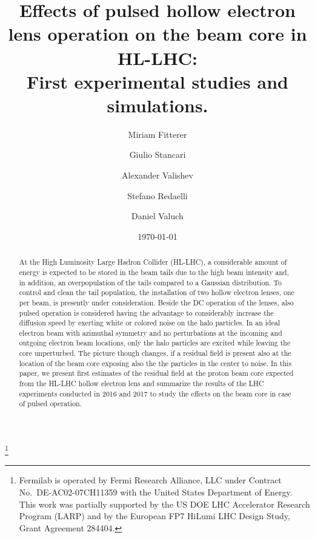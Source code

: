 \documentclass[%
 reprint,
 amsmath,amssymb,
 aps,
prstab,
]{revtex4-1}
\begin{document}
\title{Effects of pulsed hollow electron lens operation on the beam core in HL-LHC: \\First experimental studies and simulations.}%
\thanks{Fermilab is operated by Fermi Research Alliance, LLC under
	Contract No.~DE-AC02-07CH11359 with the United States Department of
	Energy. This work was partially supported by the US DOE LHC
	Accelerator Research Program (LARP) and by the European FP7 HiLumi
	LHC Design Study, Grant Agreement 284404.}

\author{Miriam Fitterer}
\author{Giulio Stancari}%
\author{Alexander Valishev}%
%

\author{Stefano Redaelli}
\author{Daniel Valuch}
%

\date{\today}%

\begin{abstract}
At the High Luminosity Large Hadron Collider (HL-LHC), a considerable amount of energy is expected to be stored in the beam tails due to the high beam intensity and, in addition, an overpopulation of the tails compared to a Gaussian distribution. To control and clean the tail population, the installation of two hollow electron lenses, one per beam, is presently under consideration. Beside the DC operation of the lenses, also pulsed operation is considered having the advantage to considerably increase the diffusion speed by exerting white or colored noise on the halo particles. In an ideal electron beam with azimuthal symmetry and no perturbations at the incoming and outgoing electron beam locations, only the halo particles are excited while leaving the core unperturbed. The picture though changes, if a residual field is present also at the location of the beam core exposing also the the particles in the center to noise. In this paper, we present first estimates of the residual field at the proton beam core expected from the HL-LHC hollow electron lens and summarize the results of the LHC experiments conducted in 2016 and 2017 to study the effects on the beam core in case of pulsed operation.
\end{abstract}

\end{document}
